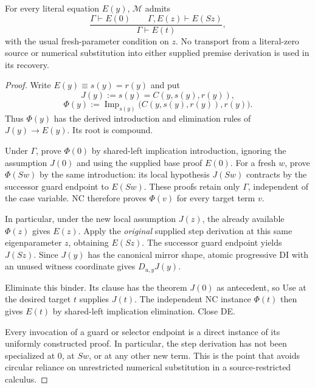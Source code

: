 \begin{theorem}\label{mir:equation-induction}
For every literal equation $E(y)$, $\mathcal M$ admits
\[
 \frac{\Gamma\vdash E(0)\qquad
       \Gamma,E(z)\vdash E(Sz)}
      {\Gamma\vdash E(t)},
 \tag{EI}\label{mir:ei}
\]
with the usual fresh-parameter condition on $z$. No transport from a
literal-zero source or numerical substitution into either supplied
premise derivation is used in its recovery.
\end{theorem}
\begin{proof}
Write $E(y)\equiv s(y)=r(y)$ and put
\[
 J(y):=s(y)=C(y,s(y),r(y)),
\]
\[
 \Phi(y):=
 \operatorname{Imp}_{s(y)}\bigl(C(y,s(y),r(y)),r(y)\bigr).
 \tag{Bootstrap implication}\label{mir:bootstrap-implication}
\]
Thus $\Phi(y)$ has the derived introduction and elimination rules of
$J(y)\to E(y)$. Its root is compound.

Under $\Gamma$, prove $\Phi(0)$ by shared-left implication introduction,
ignoring the assumption $J(0)$ and using the supplied base proof
$E(0)$. For a fresh $w$, prove $\Phi(Sw)$ by the same introduction:
its local hypothesis $J(Sw)$ contracts by the successor guard endpoint
to $E(Sw)$. These proofs retain only $\Gamma$, independent of the case
variable. NC therefore proves $\Phi(v)$ for every target term $v$.

In particular, under the new local assumption $J(z)$, the already
available $\Phi(z)$ gives $E(z)$. Apply the \emph{original} supplied
step derivation at this same eigenparameter $z$, obtaining $E(Sz)$.
The successor guard endpoint yields $J(Sz)$. Since $J(y)$ has the
canonical mirror shape, atomic progressive DI with an unused witness
coordinate gives $D_{u,y}J(y)$.

Eliminate this binder. Its clause has the theorem $J(0)$ as antecedent,
so Use at the desired target $t$ supplies $J(t)$. The independent NC
instance $\Phi(t)$ then gives $E(t)$ by shared-left implication
elimination. Close DE.

Every invocation of a guard or selector endpoint is a direct instance
of its uniformly constructed proof. In particular, the step derivation
has not been specialized at $0$, at $Sw$, or at any other new term.
This is the point that avoids circular reliance on unrestricted
numerical substitution in a source-restricted calculus.
\end{proof}

